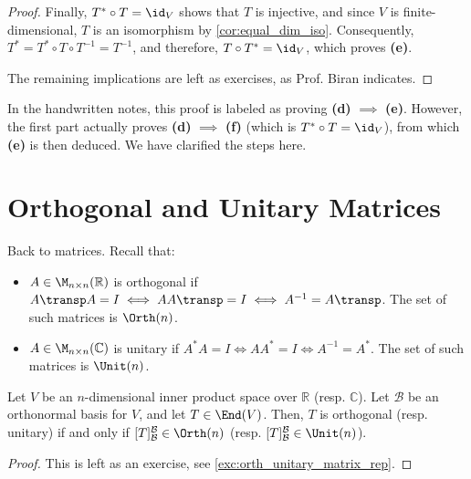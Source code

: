 \begin{proof}
Finally, $T^* \circ T = \id_V$ shows that $T$ is injective, and since $V$ is finite-di\-men\-sional, $T$ is an isomorphism by \cref{cor:equal_dim_iso}. Consequently, $T^* = T^* \circ T \circ T^{-1} = T^{-1}$, and therefore, $T \circ T^* = \id_V$, which proves \textbf{(e)}.

The remaining implications are left as exercises, as Prof. Biran indicates.
\end{proof}

\begin{ainote}
In the handwritten notes, this proof is labeled as proving \textbf{(d)} $\implies$ \textbf{(e)}. However, the first part actually proves \textbf{(d)} $\implies$ \textbf{(f)} (which is $T^* \circ T = \id_V$), from which \textbf{(e)} is then deduced. We have clarified the steps here.
\end{ainote}

\section{Orthogonal and Unitary Matrices}

\noindent
Back to matrices. Recall that:
\begin{itemize}
    \item $A \in \M_{n \times n}(\mathbb{R})$ is orthogonal if $A\transp A = I \iff AA\transp = I \iff A^{-1} = A\transp$. The set of such matrices is $\Orth(n)$.
    \item $A \in \M_{n \times n}(\mathbb{C})$ is unitary if $A^* A = I \iff AA^* = I \iff A^{-1} = A^*$. The set of such matrices is $\Unit(n)$.
\end{itemize}

\begin{proposition}
\label{prop:orth_unitary_matrix_rep}
Let $V$ be an $n$-di\-men\-sional inner product space over $\mathbb{R}$ (resp. $\mathbb{C}$). Let $\mathcal{B}$ be an orthonormal basis for $V$, and let $T \in \End(V)$. Then, $T$ is orthogonal (resp. unitary) if and only if $[T]_{\mathcal{B}}^{\mathcal{B}} \in \Orth(n)$ (resp. $[T]_{\mathcal{B}}^{\mathcal{B}} \in \Unit(n)$).
\end{proposition}

\begin{proof}
This is left as an exercise, see \cref{exc:orth_unitary_matrix_rep}.
\end{proof}

